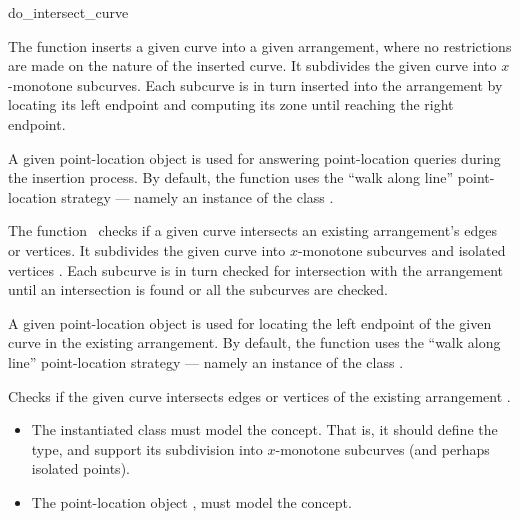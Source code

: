 \ccRefPageBegin

\begin{ccRefFunction}{do_intersect_curve}

\ccDefinition

The function \ccRefName{} inserts a given curve into a given arrangement,
where no restrictions are made on the nature of the inserted curve.
It subdivides the given curve into $x$-monotone subcurves. Each subcurve
is in turn inserted into the arrangement by locating its left endpoint
and computing its zone until reaching the right endpoint.

A given point-location object is used for answering point-location queries
during the insertion process. By default, the function uses the
``walk along line'' point-location strategy --- namely an instance of the
class .

The function \ccRefName\ checks if a given curve intersects an
existing arrangement's edges or vertices. 
It subdivides the given curve into $x$-monotone subcurves and isolated
vertices . Each subcurve is in turn checked for intersection with the 
arrangement until an intersection is found or all the subcurves are checked.

A given point-location object is used for locating the left endpoint 
of the given curve in the existing arrangement. By default, the function 
uses the ``walk along line'' point-location strategy --- namely an 
instance of the class 
.



Checks if the given curve  intersects edges or vertices of the 
existing arrangement .


\ccRequirements
\begin{itemize}
\item The instantiated  class must model the
   concept. That is, it should define the
   type, and support its subdivision into $x$-monotone
  subcurves (and perhaps isolated points).
\item The point-location object , must model the
   concept.
\end{itemize}

\end{ccRefFunction}

\ccRefPageEnd
